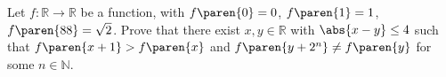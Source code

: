 Let $f : \mathbb{R} \to \mathbb{R}$ be a function, with
$f\paren{0} = 0$,
$f\paren{1} = 1$,
$f\paren{88} = \sqrt{2}$.
Prove that there exist $x,y \in \mathbb{R}$ with $\abs{x - y} \leq 4$
such that $f\paren{x + 1} > f\paren{x}$ and
$f\paren{y + 2^n} \neq f\paren{y}$ for some $n \in \mathbb{N}$.
